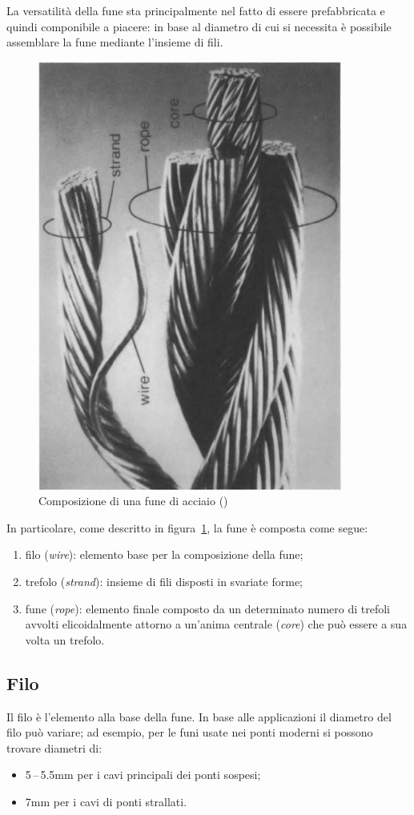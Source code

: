 La versatilità della fune sta principalmente nel fatto di essere prefabbricata e quindi componibile a piacere: in base al diametro di cui si necessita è possibile assemblare la fune mediante l'insieme di fili.

\begin{figure}[t]
	\centering
	\includegraphics[width=10cm]{Immagini/Fune}
	\caption{Composizione di una fune di acciaio (\cite{costello:fune})}
	\label{fig:fune}
\end{figure}

In particolare, come descritto in figura~\ref{fig:fune}, la fune è composta come segue:
\begin{enumerate}
	\item filo (\textit{wire}): elemento base per la composizione della fune;
	\item trefolo (\textit{strand}): insieme di fili disposti in svariate forme;
	\item fune (\textit{rope}): elemento finale composto da un determinato numero di trefoli avvolti elicoidalmente attorno a un'anima centrale (\textit{core}) che può essere a sua volta un trefolo.
\end{enumerate}

\subsection{Filo}
Il filo è l'elemento alla base della fune. In base alle applicazioni il diametro del filo può variare; ad esempio, per le funi usate nei ponti moderni si possono trovare diametri di:
\begin{itemize}
	\item \num{5}\,--\,\num{5.5}\si{mm} per i cavi principali dei ponti sospesi;
	\item \num{7}\si{mm} per i cavi di ponti strallati.
\end{itemize}


